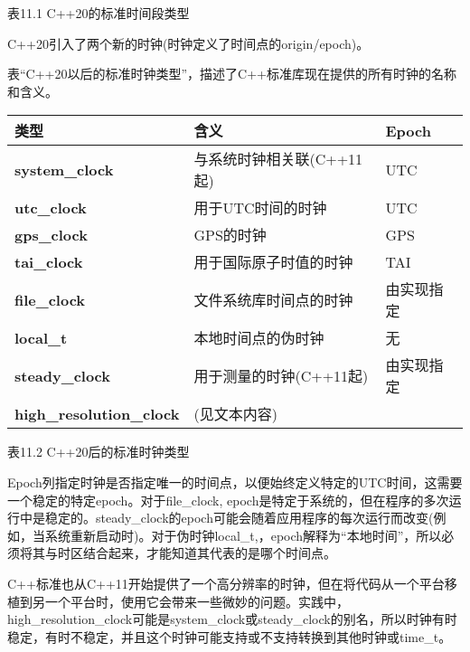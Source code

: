 \begin{center}
表11.1 C++20的标准时间段类型
\end{center}


C++20引入了两个新的时钟(时钟定义了时间点的origin/epoch)。

表“C++20以后的标准时钟类型”，描述了C++标准库现在提供的所有时钟的名称和含义。

\begin{longtable}[c]{|l|l|l|}
\hline
\textbf{类型}                    & \textbf{含义}                           & \textbf{Epoch} \\ \hline
\endfirsthead
%
\endhead
%
\textbf{system\_clock} & 与系统时钟相关联(C++11起) & UTC    \\ \hline
\textbf{utc\_clock}              & 用于UTC时间的时钟                  & UTC        \\ \hline
\textbf{gps\_clock}              & GPS的时钟                       & GPS        \\ \hline
\textbf{tai\_clock}              & 用于国际原子时值的时钟 & TAI        \\ \hline
\textbf{file\_clock}   & 文件系统库时间点的时钟       & 由实现指定 \\ \hline
\textbf{local\_t}                & 本地时间点的伪时钟          & 无           \\ \hline
\textbf{steady\_clock}           & 用于测量的时钟(C++11起)        & 由实现指定     \\ \hline
\textbf{high\_resolution\_clock} & (见文本内容)                                 &                \\ \hline
\end{longtable}

\begin{center}
表11.2 C++20后的标准时钟类型
\end{center}

Epoch列指定时钟是否指定唯一的时间点，以便始终定义特定的UTC时间，这需要一个稳定的特定epoch。对于file\_clock, epoch是特定于系统的，但在程序的多次运行中是稳定的。steady\_clock的epoch可能会随着应用程序的每次运行而改变(例如，当系统重新启动时)。对于伪时钟local\_t,，epoch解释为“本地时间”，所以必须将其与时区结合起来，才能知道其代表的是哪个时间点。

C++标准也从C++11开始提供了一个高分辨率的时钟，但在将代码从一个平台移植到另一个平台时，使用它会带来一些微妙的问题。实践中，high\_resolution\_clock可能是system\_clock或steady\_clock的别名，所以时钟有时稳定，有时不稳定，并且这个时钟可能支持或不支持转换到其他时钟或time\_t。

